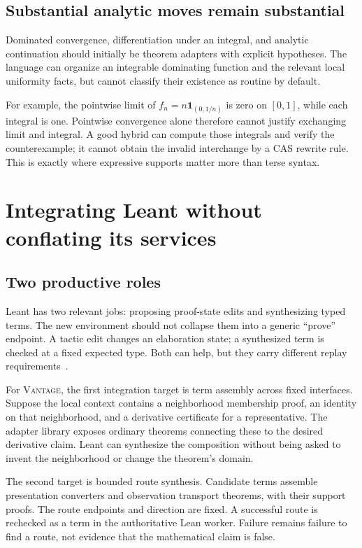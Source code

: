 \documentclass[11pt,a4paper]{article}
\newcommand{\Vantage}{\textsc{Vantage}}
\theoremstyle{definition}
\begin{document}
\subsection{Substantial analytic moves remain substantial}
Dominated convergence, differentiation under an integral, and analytic continuation
should initially be theorem adapters with explicit hypotheses. The language can
organize an integrable dominating function and the relevant local uniformity
facts, but cannot classify their existence as routine by default.

For example, the pointwise limit of
\(f_n=n\mathbf1_{(0,1/n)}\) is zero on \([0,1]\), while each integral is one.
Pointwise convergence alone therefore cannot justify exchanging limit and
integral. A good hybrid can compute those integrals and verify the counterexample;
it cannot obtain the invalid interchange by a CAS rewrite rule. This is exactly
where expressive supports matter more than terse syntax.

\section{Integrating Leant without conflating its services}\label{sec:leant}
\subsection{Two productive roles}
Leant has two relevant jobs: proposing proof-state edits and synthesizing typed
terms. The new environment should not collapse them into a generic ``prove''
endpoint. A tactic edit changes an elaboration state; a synthesized term is
checked at a fixed expected type. Both can help, but they carry different replay
requirements~\cite{l-main,l-fragment}.

For \Vantage, the first integration target is term assembly across fixed interfaces.
Suppose the local context contains a neighborhood membership proof, an identity
on that neighborhood, and a derivative certificate for a representative. The
adapter library exposes ordinary theorems connecting these to the desired
derivative claim. Leant can synthesize the composition without being asked to
invent the neighborhood or change the theorem's domain.

The second target is bounded route synthesis. Candidate terms assemble
presentation converters and observation transport theorems, with their support
proofs. The route endpoints and direction are fixed. A successful route is
rechecked as a term in the authoritative Lean worker. Failure remains failure
to find a route, not evidence that the mathematical claim is false.
\end{document}
